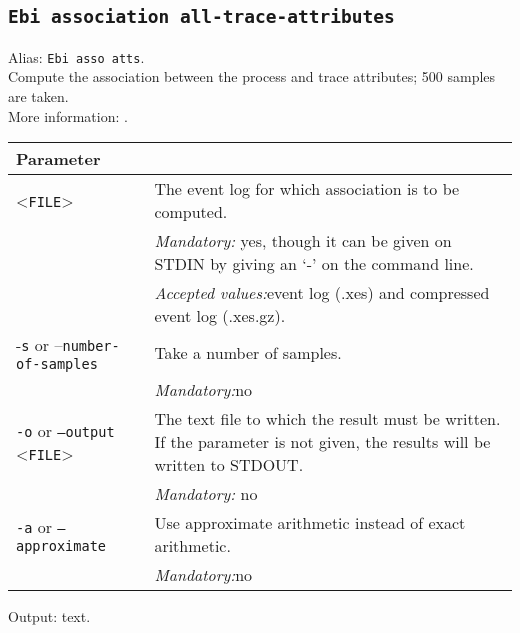 {\subsection{\texttt{Ebi association all-trace-attributes}}
\label{command:Ebi association all-trace-attributes}
Alias: \texttt{Ebi asso atts}.\\
Compute the association between the process and trace attributes; 500 samples are taken.\\
More information: \cite{DBLP:journals/tkde/LeemansMPH23}.\\
\begin{tabularx}{\linewidth}{lX}
\toprule
Parameter \\\midrule
<\texttt{FILE}>&The event log for which association is to be computed.\\
&\textit{Mandatory:} \quad yes, though it can be given on STDIN by giving an `-' on the command line.\\
&\textit{Accepted values:}\quad event log (.xes) and compressed event log (.xes.gz).\\
-\texttt{s} or --\texttt{number-of-samples}
&Take a number of samples.\\
&\textit{Mandatory:}\quad no\\
\texttt{-o} or \texttt{--output} <\texttt{FILE}> &
The text file to which the result must be written. If the parameter is not given, the results will be written to STDOUT.\\
&\textit{Mandatory:} \quad no\\
\texttt{-a} or \texttt{--approximate} & Use approximate arithmetic instead of exact arithmetic.\\
&\textit{Mandatory:}\quad no\\
\bottomrule
\end{tabularx}
Output: text.
}
